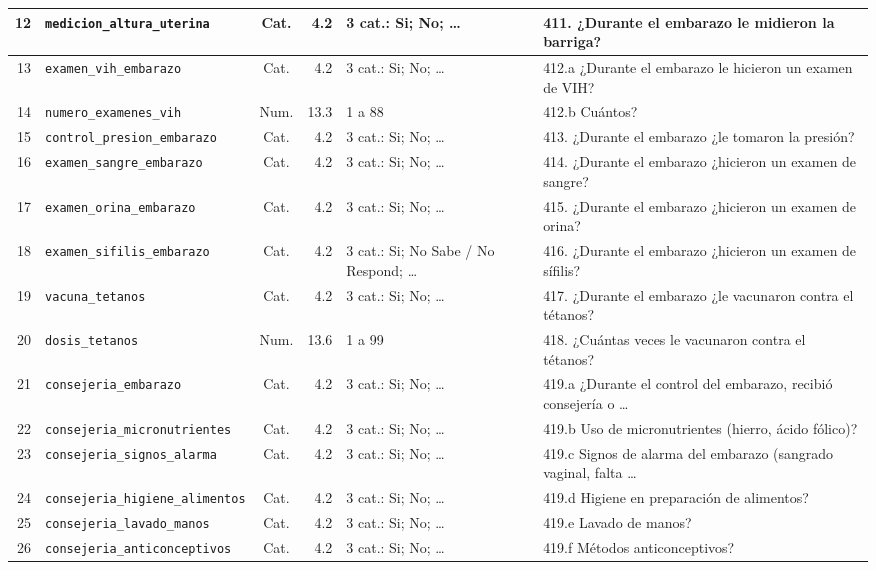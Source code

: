 \begin{longtable}{|r|p{3.1cm}|c|r|p{3.0cm}|p{3.8cm}|}
  12 & \texttt{medicion\_altura\_uterina} & Cat. & 4.2 & 3 cat.: Si; No; … & 411.  ¿Durante el embarazo le midieron la barriga? \\ \hline
  13 & \texttt{examen\_vih\_embarazo} & Cat. & 4.2 & 3 cat.: Si; No; … & 412.a ¿Durante el embarazo le hicieron un examen de VIH? \\ \hline
  14 & \texttt{numero\_examenes\_vih} & Num. & 13.3 & 1 a 88 & 412.b Cuántos? \\ \hline
  15 & \texttt{control\_presion\_embarazo} & Cat. & 4.2 & 3 cat.: Si; No; … & 413.  ¿Durante el embarazo ¿le tomaron la presión? \\ \hline
  16 & \texttt{examen\_sangre\_embarazo} & Cat. & 4.2 & 3 cat.: Si; No; … & 414.  ¿Durante el embarazo ¿hicieron un examen de sangre? \\ \hline
  17 & \texttt{examen\_orina\_embarazo} & Cat. & 4.2 & 3 cat.: Si; No; … & 415.  ¿Durante el embarazo ¿hicieron un examen de orina? \\ \hline
  18 & \texttt{examen\_sifilis\_embarazo} & Cat. & 4.2 & 3 cat.: Si; No Sabe / No Respond; … & 416.  ¿Durante el embarazo ¿hicieron un examen de sífilis? \\ \hline
  19 & \texttt{vacuna\_tetanos} & Cat. & 4.2 & 3 cat.: Si; No; … & 417.  ¿Durante el embarazo ¿le vacunaron contra el tétanos? \\ \hline
  20 & \texttt{dosis\_tetanos} & Num. & 13.6 & 1 a 99 & 418.  ¿Cuántas veces le vacunaron contra el tétanos? \\ \hline
  21 & \texttt{consejeria\_embarazo} & Cat. & 4.2 & 3 cat.: Si; No; … & 419.a ¿Durante el control del embarazo, recibió consejería o … \\ \hline
  22 & \texttt{consejeria\_micronutrientes} & Cat. & 4.2 & 3 cat.: Si; No; … & 419.b Uso de micronutrientes (hierro, ácido fólico)? \\ \hline
  23 & \texttt{consejeria\_signos\_alarma} & Cat. & 4.2 & 3 cat.: Si; No; … & 419.c Signos de alarma del embarazo (sangrado vaginal, falta … \\ \hline
  24 & \texttt{consejeria\_higiene\_alimentos} & Cat. & 4.2 & 3 cat.: Si; No; … & 419.d Higiene en preparación de alimentos? \\ \hline
  25 & \texttt{consejeria\_lavado\_manos} & Cat. & 4.2 & 3 cat.: Si; No; … & 419.e Lavado de manos? \\ \hline
  26 & \texttt{consejeria\_anticonceptivos} & Cat. & 4.2 & 3 cat.: Si; No; … & 419.f Métodos anticonceptivos? \\ \hline

\end{longtable}
